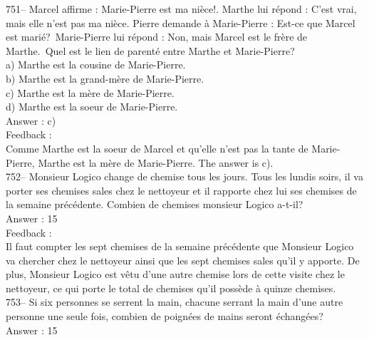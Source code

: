 ﻿\documentclass[letterpaper, 12pt]{article}
\begin{document}
751-- Marcel affirme : \og Marie-Pierre est ma ni\`ece!\fg .  Marthe
lui r\'epond : \og C'est vrai, mais elle n'est pas ma ni\`ece\fg .
Pierre demande \`a Marie-Pierre : \og Est-ce que Marcel est
mari\'e?\fg\ Marie-Pierre lui r\'epond : \og Non, mais Marcel est le
fr\`ere de Marthe.\fg\  Quel est le lien de parent\'e
entre Marthe et Marie-Pierre?\\
a) Marthe est la cousine de Marie-Pierre.\\
b) Marthe est la grand-m\`ere de Marie-Pierre.\\
c) Marthe est la m\`ere de Marie-Pierre.\\
d) Marthe est la soeur de Marie-Pierre.\\

Answer : c)\\

Feedback : \\
Comme Marthe est la soeur de Marcel et qu'elle n'est pas la tante de
Marie-Pierre, Marthe est la m\`ere de Marie-Pierre.  The answer is c).\\

752-- Monsieur Logico change de chemise tous les jours.  Tous les lundis
soirs, il va porter ses chemises sales chez le nettoyeur et il rapporte chez
lui ses chemises de la semaine pr\'ec\'edente.  Combien de chemises monsieur
Logico a-t-il?\\

Answer : 15\\

Feedback : \\
Il faut compter les sept chemises de la semaine pr\'ec\'edente que Monsieur
Logico va chercher chez le nettoyeur ainsi que les sept chemises sales qu'il
y apporte. De plus, Monsieur Logico est v\^etu d'une autre chemise lors de
cette visite chez le nettoyeur, ce qui porte le total de chemises qu'il
poss\`ede \`a quinze chemises.\\

753-- Si six personnes se serrent la main, chacune serrant la main d'une
autre personne une seule fois, combien de poign\'ees de mains seront
\'echang\'ees?\\

Answer : 15\\
\end{document}
